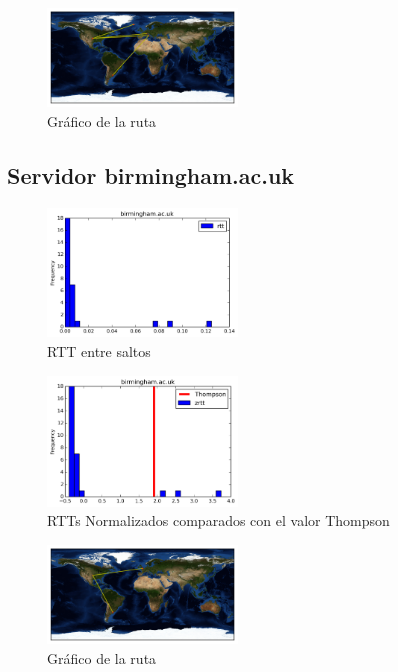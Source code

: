 \begin{figure}[H]
  \centering
    \includegraphics[width=0.45\textwidth]{grafico-rutas/bifrost-is.png}
  \caption{Gráfico de la ruta}
  \label{entropia-s}
\end{figure}




\subsection{Servidor birmingham.ac.uk}
\begin{figure}[H]
  \centering
    \includegraphics[width=0.45\textwidth]{histogramas_rtt/birmingham-ac-uk.png}
  \caption{RTT entre saltos}
  \label{entropia-s}
\end{figure}

\begin{figure}[H]
  \centering
    \includegraphics[width=0.45\textwidth]{histogramas_thompson/birmingham-ac-uk.png}
  \caption{RTTs Normalizados comparados con el valor Thompson}
  \label{entropia-s}
\end{figure}

\begin{figure}[H]
  \centering
    \includegraphics[width=0.45\textwidth]{grafico-rutas/birmingham-ac-uk.png}
  \caption{Gráfico de la ruta}
  \label{entropia-s}
\end{figure}